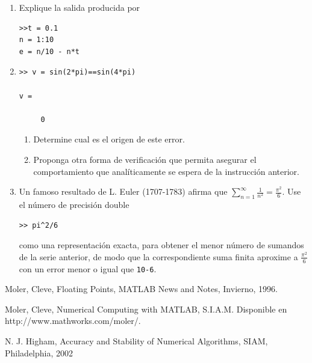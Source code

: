 \documentclass[12pt,letterpaper]{article}
\begin{document}
\begin{enumerate}
\item Explique la salida producida por
\begin{verbatim}
>>t = 0.1
n = 1:10
e = n/10 - n*t
\end{verbatim}


\item 

\begin{verbatim}
>> v = sin(2*pi)==sin(4*pi)

v =

     0
\end{verbatim}

\begin{enumerate}
\item Determine cual es el origen de este error.

\item Proponga otra forma de verificación que permita asegurar el comportamiento que anal\'iticamente se espera de la instrucci\'on anterior.

\end{enumerate}

\item Un famoso resultado de L. Euler (1707-1783) afirma que
$ \displaystyle \sum_{n=1}^\infty \frac{1}{n^2} = \frac{\pi^2}{6}$.
Use el n\'umero de precisi\'on double 
\begin{verbatim}
>> pi^2/6
\end{verbatim}
como una representaci\'on exacta, para obtener 
el menor número de sumandos de la serie anterior, de modo que la correspondiente
suma finita aproxime a $\frac{\pi^2}{6}$ con un error menor o igual que \texttt{10-6}.

\end{enumerate}


\begin{thebibliography}{9}

 Moler, Cleve, Floating Points, MATLAB News and Notes, Invierno, 1996. 

 Moler, Cleve, Numerical Computing with MATLAB, S.I.A.M. Disponible en http://www.mathworks.com/moler/.

 N. J. Higham, Accuracy and Stability of Numerical Algorithms, SIAM, Philadelphia, 2002
\end{thebibliography}
\end{document}
